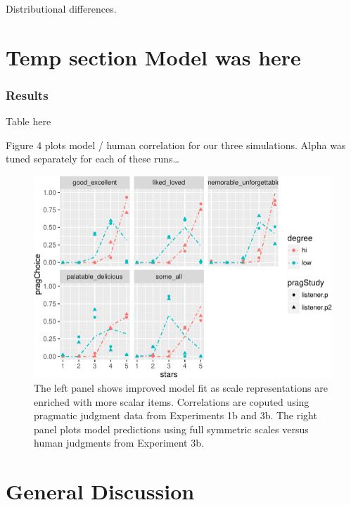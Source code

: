 \documentclass[10pt, letterpaper]{article}
\newenvironment{CodeChunk}{}{}
\begin{document}
Distributional differences.

\section{Temp section Model was here}\label{temp-section-model-was-here}

\subsubsection{Results}\label{results}

Table here

Figure 4 plots model / human correlation for our three simulations.
Alpha was tuned separately for each of these runs\ldots{}

\begin{CodeChunk}
\begin{figure}[t]

{\centering \includegraphics{figs/performancePlots-1} 

}

\caption[The left panel shows improved model fit as scale representations are enriched with more scalar items]{The left panel shows improved model fit as scale representations are enriched with more scalar items. Correlations are coputed using pragmatic judgment data from Experiments 1b and 3b. The right panel plots model predictions using full symmetric scales versus human judgments from Experiment 3b.}\label{fig:performancePlots}
\end{figure}
\end{CodeChunk}

\section{General Discussion}\label{general-discussion}
\end{document}
